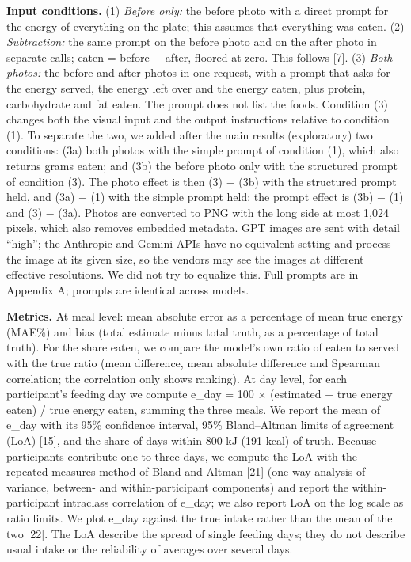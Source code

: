 \documentclass[
  11pt,
  letterpaper]{article}
\begin{document}
\textbf{Input conditions.} (1) \emph{Before only:} the before photo with a direct prompt for the energy of
everything on the plate; this assumes that everything was eaten. (2) \emph{Subtraction:} the same prompt on
the before photo and on the after photo in separate calls; eaten = before − after, floored at zero. This
follows {[}7{]}. (3) \emph{Both photos:} the before and after photos in one request, with a prompt that asks
for the energy served, the energy left over and the energy eaten, plus protein, carbohydrate and fat eaten.
The prompt does not list the foods. Condition (3) changes both the visual input and the output instructions
relative to condition (1). To separate the two, we added after the main results (exploratory) two conditions:
(3a) both photos with the simple prompt of condition (1), which also returns grams eaten; and (3b) the before
photo only with the structured prompt of condition (3). The photo effect is then (3) − (3b) with the
structured prompt held, and (3a) − (1) with the simple prompt held; the prompt effect is (3b) − (1) and (3) −
(3a). Photos are converted to PNG with the long side at most 1,024 pixels, which also removes embedded
metadata. GPT images are sent with detail ``high''; the Anthropic and Gemini APIs have no equivalent setting
and process the image at its given size, so the vendors may see the images at different effective resolutions.
We did not try to equalize this. Full prompts are in Appendix A; prompts are identical across models.

\textbf{Metrics.} At meal level: mean absolute error as a percentage of mean true energy (MAE\%) and bias
(total estimate minus total truth, as a percentage of total truth). For the share eaten, we compare the
model's own ratio of eaten to served with the true ratio (mean difference, mean absolute difference and
Spearman correlation; the correlation only shows ranking). At day level, for each participant's feeding day we
compute e\_day = 100 × (estimated − true energy eaten) / true energy eaten, summing the three meals. We report
the mean of e\_day with its 95\% confidence interval, 95\% Bland--Altman limits of agreement (LoA) {[}15{]},
and the share of days within 800 kJ (191 kcal) of truth. Because participants contribute one to three days, we
compute the LoA with the repeated-measures method of Bland and Altman {[}21{]} (one-way analysis of variance,
between- and within-participant components) and report the within-participant intraclass correlation of
e\_day; we also report LoA on the log scale as ratio limits. We plot e\_day against the true intake rather
than the mean of the two {[}22{]}. The LoA describe the spread of single feeding days; they do not describe
usual intake or the reliability of averages over several days.
\end{document}
